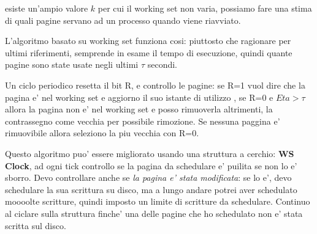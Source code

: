         esiste un'ampio valore $k$ per cui il working set non varia, possiamo fare una stima di quali pagine
        servano ad un processo quando viene riavviato.

        L'algoritmo basato su working set funziona cosi: piuttosto che ragionare per ultimi riferimenti, semprende
        in esame il tempo di esecuzione, quindi quante pagine sono state usate negli ultimi $\tau$ secondi.

        Un ciclo periodico resetta il bit R, e controllo le pagine: se R=1 vuol dire che la pagina e' nel working set e aggiorno il suo istante di utilizzo
        , se R=0 e $Eta>\tau$ allora la pagina non e' nel working set e posso rimuoverla altrimenti, la contrassegno come vecchia per possibile rimozione.
        Se nessuna paggina e' rimuovibile allora seleziono la piu vecchia con R=0. 

        Questo algoritmo puo' essere migliorato usando una struttura a cerchio: \textbf{WS Clock}, ad ogni tick controllo se la pagina da schedulare e' puilita
        se non lo e' sborro. Devo controllare anche se \textit{la pagina e' stata modificata}:
        se lo e', devo schedulare la sua scrittura su disco, ma a lungo andare potrei aver schedulato moooolte scritture, quindi imposto un limite di scritture da schedulare.
        Continuo al ciclare sulla struttura finche' una delle pagine che ho schedulato non e' stata scritta sul disco.